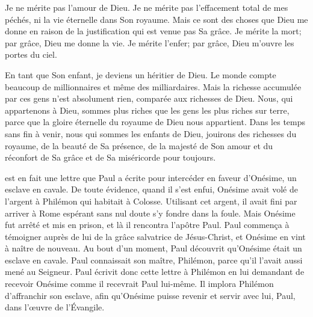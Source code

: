 
Je ne mérite pas l'amour de Dieu. Je ne mérite pas l'effacement total
 de mes péchés, ni la vie éternelle dans Son royaume.
 Mais ce sont des choses que Dieu me donne en raison de la justification
 qui est venue pas Sa grâce. Je mérite la mort; par grâce,
 Dieu me donne la vie. Je mérite l'enfer; par grâce,
 Dieu m'ouvre les portes du ciel. 

En tant que Son enfant, je deviens un héritier de Dieu.
 Le monde compte beaucoup de millionnaires et même des milliardaires.
 Mais la richesse accumulée par ces gens n'est absolument rien,
 comparée aux richesses de Dieu. Nous, qui appartenons à Dieu,
 sommes plus riches que les gens les plus riches sur terre,
 parce que la gloire éternelle du royaume de Dieu nous appartient.
 Dans les temps sans fin à venir, nous qui sommes les enfants de Dieu,
 jouirons des richesses du royaume, de la beauté de Sa présence,
 de la majesté de Son amour et du réconfort de Sa grâce
 et de Sa miséricorde \ocadr pour toujours. 

\dvrule






 est en fait une lettre que Paul
 a écrite pour intercéder en faveur d'Onésime, un esclave en cavale.
 De toute évidence, quand il s'est enfui, Onésime avait volé de l'argent
 à Philémon qui habitait à Colosse.
 Utilisant cet argent, il avait fini par arriver à Rome
 \ocadr espérant sans nul doute s'y fondre dans la foule.
 Mais Onésime fut arrêté et mis en prison, et là il rencontra
 l'apôtre Paul. Paul commença à témoigner auprès de lui de la grâce
 salvatrice de Jésus-Christ, et Onésime en vint à naître de nouveau.
 Au bout d'un moment, Paul découvrit qu'Onésime était un esclave en cavale.
 Paul connaissait son maître, Philémon, parce qu'il l'avait aussi
 mené au Seigneur. Paul écrivit donc cette lettre à Philémon
 en lui demandant de recevoir Onésime comme il recevrait Paul lui-même.
 Il implora Philémon d'affranchir son esclave, afin qu'Onésime
 puisse revenir et servir avec lui, Paul, dans l'œuvre de l'Évangile.

